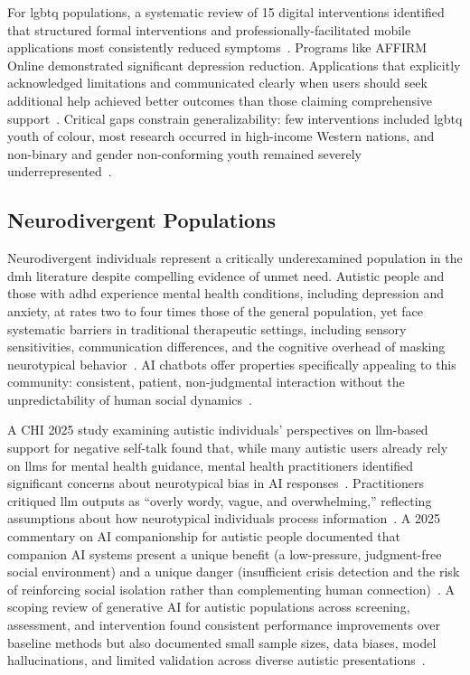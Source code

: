 For \gls{lgbtq} populations, a systematic review of 15 digital interventions identified that structured formal interventions and professionally-facilitated mobile applications most consistently reduced symptoms~\cite{liu_2023}. Programs like AFFIRM Online demonstrated significant depression reduction. Applications that explicitly acknowledged limitations and communicated clearly when users should seek additional help achieved better outcomes than those claiming comprehensive support~\cite{drydakis_2022}. Critical gaps constrain generalizability: few interventions included \gls{lgbtq} youth of colour, most research occurred in high-income Western nations, and non-binary and gender non-conforming youth remained severely underrepresented~\cite{liu_2023}.

\subsection{Neurodivergent Populations}

Neurodivergent individuals represent a critically underexamined population in the \gls{dmh} literature despite compelling evidence of unmet need. Autistic people and those with \gls{adhd} experience mental health conditions, including depression and anxiety, at rates two to four times those of the general population, yet face systematic barriers in traditional therapeutic settings, including sensory sensitivities, communication differences, and the cognitive overhead of masking neurotypical behavior~\cite{papadopoulos_2025}. AI chatbots offer properties specifically appealing to this community: consistent, patient, non-judgmental interaction without the unpredictability of human social dynamics~\cite{papadopoulos_2025}.

A CHI 2025 study examining autistic individuals' perspectives on \gls{llm}-based support for negative self-talk found that, while many autistic users already rely on \gls{llm}s for mental health guidance, mental health practitioners identified significant concerns about neurotypical bias in AI responses~\cite{killian_2023}. Practitioners critiqued \gls{llm} outputs as ``overly wordy, vague, and overwhelming,'' reflecting assumptions about how neurotypical individuals process information~\cite{killian_2023}. A 2025 commentary on AI companionship for autistic people documented that companion AI systems present a unique benefit (a low-pressure, judgment-free social environment) and a unique danger (insufficient crisis detection and the risk of reinforcing social isolation rather than complementing human connection)~\cite{papadopoulos_2025}. A scoping review of generative AI for autistic populations across screening, assessment, and intervention found consistent performance improvements over baseline methods but also documented small sample sizes, data biases, model hallucinations, and limited validation across diverse autistic presentations~\cite{dehghani_2024}.

